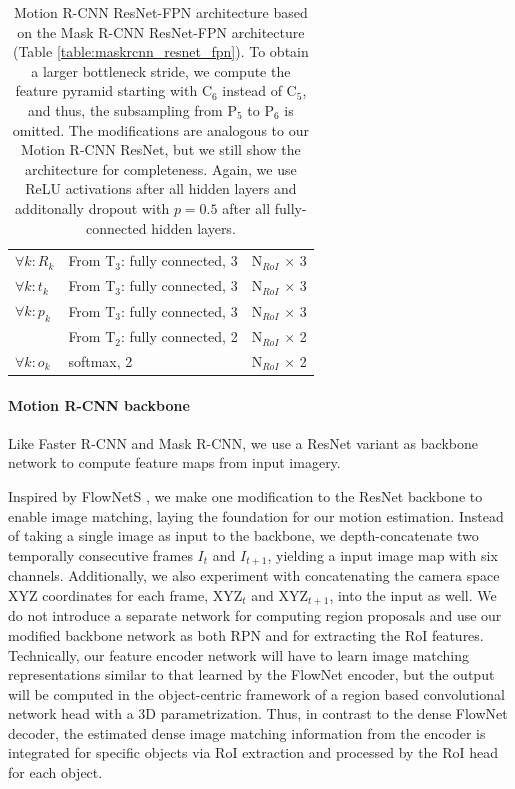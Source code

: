 {\begin{table}[h]
\begin{tabular}{llr}
$\forall k: R_k$ & From T$_3$: fully connected, 3 & N$_{RoI}$ $\times$ 3 \\
$\forall k: t_k$ & From T$_3$: fully connected, 3 & N$_{RoI}$ $\times$ 3 \\
$\forall k: p_k$ & From T$_3$: fully connected, 3 & N$_{RoI}$ $\times$ 3 \\
& From T$_2$: fully connected, 2 & N$_{RoI}$ $\times$ 2 \\
$\forall k: o_k$ & softmax, 2 & N$_{RoI}$ $\times$ 2 \\

\bottomrule
\end{tabular}

\caption {
Motion R-CNN ResNet-FPN architecture based on the Mask R-CNN
ResNet-FPN architecture (Table \ref{table:maskrcnn_resnet_fpn}).
To obtain a larger bottleneck stride, we compute the feature pyramid starting
with C$_6$ instead of C$_5$, and thus, the subsampling from P$_5$ to P$_6$ is omitted.
The modifications are analogous to our Motion R-CNN ResNet,
but we still show the architecture for completeness.
Again, we use ReLU activations after all hidden layers and
additonally dropout with $p = 0.5$ after all fully-connected hidden layers.
}
\label{table:motionrcnn_resnet_fpn}
\end{table}
}

\paragraph{Motion R-CNN backbone}
Like Faster R-CNN and Mask R-CNN, we use a ResNet \cite{ResNet} variant as backbone network to compute feature maps from input imagery.

Inspired by FlowNetS \cite{FlowNet}, we make one modification to the ResNet backbone to enable image matching,
laying the foundation for our motion estimation. Instead of taking a single image as input to the backbone,
we depth-concatenate two temporally consecutive frames $I_t$ and $I_{t+1}$, yielding a input image map with six channels.
Additionally, we also experiment with concatenating the camera space XYZ coordinates for each frame,
XYZ$_t$ and XYZ$_{t+1}$, into the input as well.
We do not introduce a separate network for computing region proposals and use our modified backbone network
as both RPN and for extracting the RoI features.
Technically, our feature encoder network will have to learn image matching representations similar to
that learned by the FlowNet encoder, but the output will be computed in the
object-centric framework of a region based convolutional network head with a 3D parametrization.
Thus, in contrast to the dense FlowNet decoder, the estimated dense image matching information
from the encoder is integrated for specific objects via RoI extraction and
processed by the RoI head for each object.

